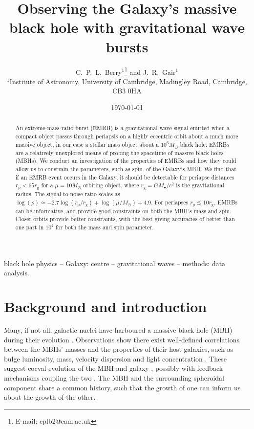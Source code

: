 \documentclass[useAMS,usedcolumn,usegraphicx,usenatbib]{mn2e}
\title[Observing the Galaxy's MBH with GW bursts]{Observing the Galaxy's massive black hole with gravitational wave bursts}
\author[C.\ P.\ L.\ Berry and J.\ R.\ Gair]{C.\ P.\ L.\ Berry$^{1}$\thanks{E-mail: cplb2@cam.ac.uk}  and J.\ R.\ Gair$^{1}$\\
$^{1}$Institute of Astronomy, University of Cambridge, Madingley Road, Cambridge, CB3 0HA}
\newcommand{\sub}[1]{\ensuremath{_\mathrm{#1}}}
\begin{document}
\date{\today}

\pagerange{\pageref{firstpage}--\pageref{lastpage}} 

\maketitle

\label{firstpage}

\begin{abstract}
An extreme-mass-ratio burst (EMRB) is a gravitational wave signal emitted when a compact object passes through periapsis on a highly eccentric orbit about a much more massive object, in our case a stellar mass object about a $10^6 M_\odot$ black hole. EMRBs are a relatively unexplored means of probing the spacetime of massive black holes (MBHs). We conduct an investigation of the properties of EMRBs and how they could allow us to constrain the parameters, such as spin, of the Galaxy's MBH. We find that if an EMRB event occurs in the Galaxy, it should be detectable for periapse distances $r\sub{p} < 65 r\sub{g}$ for a $\mu = 10 M_\odot$ orbiting object, where $r\sub{g} = GM_\bullet/c^2$ is the gravitational radius. The signal-to-noise ratio scales as $\log(\rho) \simeq -2.7\log(r\sub{p}/r\sub{g}) + \log(\mu/M_\odot) + 4.9$. For periapses $r\sub{p} \lesssim 10 r\sub{g}$, EMRBs can be informative, and provide good constraints on both the MBH's mass and spin. Closer orbits provide better constraints, with the best giving accuracies of better than one part in $10^4$ for both the mass and spin parameter.
\end{abstract}

\begin{keywords}
black hole physics -- Galaxy: centre -- gravitational waves -- methods: data analysis.
\end{keywords}

\section{Background and introduction}\label{sec:Intro}

Many, if not all, galactic nuclei have harboured a massive black hole (MBH) during their evolution \citep{Lynden-Bell1971, Rees1984}. Observations show there exist well-defined correlations between the MBHs' masses and the properties of their host galaxies, such as bulge luminosity, mass, velocity dispersion and light concentration \citep[e.g.][]{Kormendy1995, Magorrian1998, Graham2001, Tremaine2002, Graham2011}. These suggest coeval evolution of the MBH and galaxy \citep{Peng2007, Jahnke2011}, possibly with feedback mechanisms coupling the two \citep{Haiman2004, Volonteri2009}. The MBH and the surrounding spheroidal component share a common history, such that the growth of one can inform us about the growth of the other.
\end{document}
